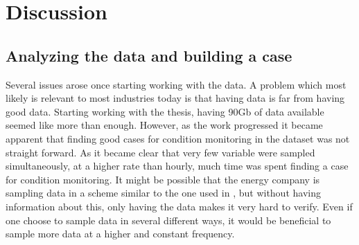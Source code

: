 \chapter{Discussion}\label{cha:discussion}

    


\section{Analyzing the data and building a case}
     Several issues arose once starting working with the data. A problem which most likely is relevant to most industries today is that having data is far from having good data. Starting working with the thesis, having 90Gb of data available seemed like more than enough. However, as the work progressed it became apparent that finding good cases for condition monitoring in the dataset was not straight forward. As it became clear that very few variable were sampled simultaneously, at a higher rate than hourly, much time was spent finding a case for condition monitoring. It might be possible that the energy company is sampling data in a scheme similar to the one used in \cite{cmfd paper}, but without having information about this, only having the data makes it very hard to verify. Even if one choose to sample data in several different ways, it would be beneficial to sample more data at a higher and constant frequency.
     
